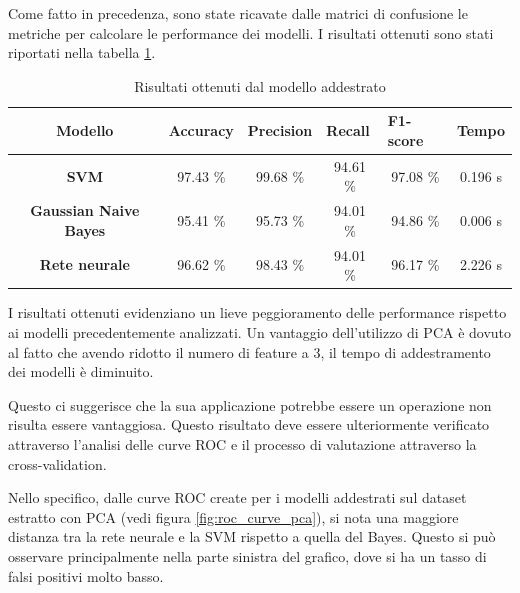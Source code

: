 Come fatto in precedenza, sono state ricavate dalle matrici di confusione le
metriche per calcolare le performance dei modelli. I risultati ottenuti sono stati
riportati nella tabella \ref{tab:risultati_pca}.
\begin{table}[!ht]
    \centering
    \begin{tabular}{@{}clllll@{}}
        \toprule
        \rowcolor[HTML]{EFEFEF}
        \textbf{Modello}                                      & \textbf{Accuracy}            & \textbf{Precision}           & \textbf{Recall}              & \textbf{F1-score}            & \textbf{Tempo}              \\ \midrule
        \cellcolor[HTML]{EFEFEF}\textbf{SVM}                  & \multicolumn{1}{c}{97.43 \%} & \multicolumn{1}{c}{99.68 \%} & \multicolumn{1}{c}{94.61 \%} & \multicolumn{1}{c}{97.08 \%} & \multicolumn{1}{c}{0.196 s} \\
        \cellcolor[HTML]{EFEFEF}\textbf{Gaussian Naive Bayes} & \multicolumn{1}{c}{95.41 \%} & \multicolumn{1}{c}{95.73 \%} & \multicolumn{1}{c}{94.01 \%} & \multicolumn{1}{c}{94.86 \%} & \multicolumn{1}{c}{0.006 s} \\
        \cellcolor[HTML]{EFEFEF}\textbf{Rete neurale}         & \multicolumn{1}{c}{96.62 \%} & \multicolumn{1}{c}{98.43 \%} & \multicolumn{1}{c}{94.01 \%} & \multicolumn{1}{c}{96.17 \%} & \multicolumn{1}{c}{2.226 s} \\ \bottomrule
    \end{tabular}
    \caption{Risultati ottenuti dal modello addestrato}
    \label{tab:risultati_pca}
\end{table}

I risultati ottenuti evidenziano un lieve peggioramento delle performance
rispetto ai modelli precedentemente analizzati. Un vantaggio dell'utilizzo di
PCA è dovuto al fatto che avendo ridotto il numero di feature a $3$, il tempo di
addestramento dei modelli è diminuito.

Questo ci suggerisce che la sua applicazione potrebbe essere un operazione
non risulta essere vantaggiosa. Questo risultato deve essere ulteriormente
verificato attraverso l'analisi delle curve ROC e il processo di valutazione
attraverso la cross-validation.

Nello specifico, dalle curve ROC create per i modelli addestrati sul dataset
estratto con PCA (vedi figura \ref{fig:roc_curve_pca}), si nota una maggiore
distanza tra la rete neurale e la SVM rispetto a quella del Bayes.
Questo si può osservare principalmente nella parte sinistra del grafico, dove si
ha un tasso di falsi positivi molto basso.


